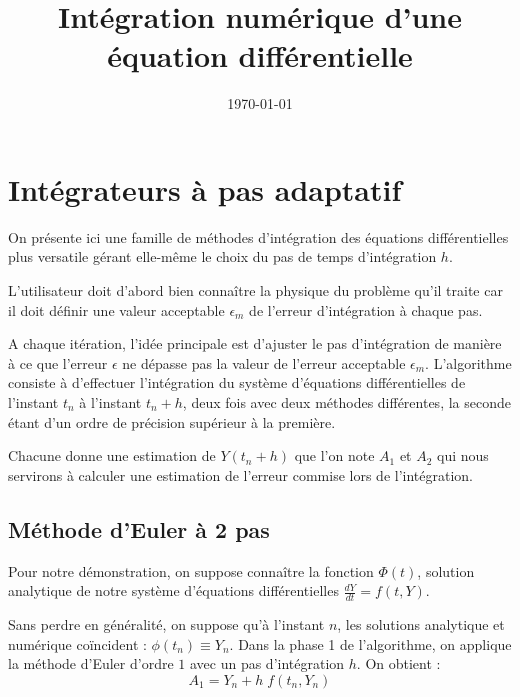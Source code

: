 \documentclass[a4paper, 12pt]{article}
\begin{document}


\title{Intégration numérique d'une équation différentielle}

\date{\today}
 
\maketitle

\section{Intégrateurs à pas adaptatif}

On présente ici une famille de méthodes d'intégration des équations différentielles plus  versatile gérant elle-même le choix
du pas de temps d’intégration $h$. 

L'utilisateur doit d'abord bien connaître la physique du problème qu'il traite car 
il doit définir une valeur acceptable $\epsilon_m$ de l'erreur d'intégration
à chaque pas. 

A chaque itération, l'idée principale est d’ajuster le pas d’intégration de manière 
à ce que l’erreur $\epsilon$ ne dépasse pas la valeur de l’erreur acceptable $\epsilon_m$.
L'algorithme consiste à d’effectuer l’intégration du système d’équations différentielles de l’instant $t_n$ à l’instant $t_n+h$, deux fois avec 
 deux méthodes différentes, la seconde étant d'un ordre de précision supérieur à la première.

Chacune donne une estimation de $Y(t_n+h)$ que l’on note $A_1$ et $A_2$ qui nous servirons à
calculer une estimation de l’erreur commise lors de l’intégration.

\subsection{Méthode d'Euler à 2 pas}

Pour notre démonstration, on suppose connaître la fonction $\Phi(t)$, solution analytique de notre système d'équations
 différentielles $\frac{dY}{dt} = f(t, Y)$.

Sans perdre en généralité, on suppose qu'à l'instant $n$, les solutions analytique et numérique coïncident : $\phi(t_n) \equiv Y_n$.
Dans la phase 1 de l'algorithme, on applique la méthode d'Euler d'ordre $1$ avec un pas d'intégration $h$.
On obtient : 
 \begin{equation}
 A_1 =  Y_n + h \; f(t_n, Y_n)
 \label{Euler_phase1}
 \end{equation}
 
\end{document}
